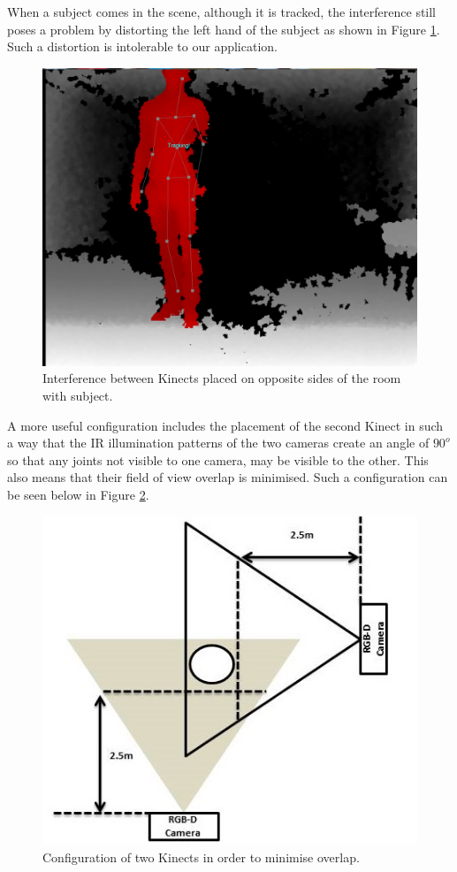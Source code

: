 \documentclass[10pt]{article}
\begin{document}
When a subject comes in the scene, although it is tracked, the interference still poses a problem by distorting the left hand of the subject as shown in Figure \ref{IR_interference_w_subject}. Such a distortion is intolerable to our application. 

\begin{figure}[H]
\centering
\includegraphics[scale=0.2]{IR_Interference3.jpg}
\caption{Interference between Kinects placed on opposite sides of the room with subject.}
\label{IR_interference_w_subject}
\end{figure}

A more useful configuration includes the placement of the second Kinect in such a way that the IR illumination patterns of the two cameras create an angle of $90^o$ so that any joints not visible to one camera, may be visible to the other. This also means that their field of view overlap is minimised. Such a configuration can be seen below in Figure \ref{2_cameras_config2}.

\begin{figure}[H]
\centering
\includegraphics[scale=0.4]{figure_2cameras.jpg}
\caption{Configuration of two Kinects in order to minimise overlap.}
\label{2_cameras_config2}
\end{figure}
\end{document}
